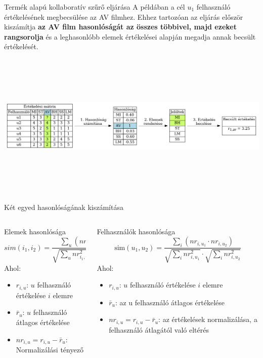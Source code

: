 \documentclass[english, aspectratio=169]{beamer}
\begin{document}
\begin{frame}{Termék alapú kollaboratív szűrő eljárása}
A példában a cél $u_1$ felhasználó értékelésének megbecsülése az AV filmhez. Ehhez tartozóan  az eljárás először kiszámítja \textbf{az AV film hasonlóságát az összes többivel, majd ezeket rangsorolja} és a leghasonlóbb elemek értékelései alapján megadja annak becsült értékelését.\par\medskip
\begin{center}
\includegraphics[width=14cm, height=7cm, keepaspectratio]{graphs/recommender_5.png}
\end{center}
\end{frame}

\begin{frame}{Két egyed hasonlóságának kiszámítása}
\begin{columns}
\begin{column}{.5\textwidth}
\begin{block}{Elemek hasonlósága}
\[
sim\left( i_1,i_2 \right) = \frac{\sum_u\left( nr_{i_1,u} \cdot nr_{i_2,u} \right)}{\sqrt{\sum_u nr^2_{i_1,u}} \cdot \sqrt{\sum_u nr^2_{i_1,u}}}
\]
Ahol:
\begin{itemize}
	\item $r_{i,u}$: $u$ felhasználó értékelése $i$ elemre
	\item $\bar{r}_u$: $u$ felhasználó átlagos értékelése
	\item $nr_{i,u}=r_{i,u} - \bar{r}_u$: Normalizálási tényező
\end{itemize}
\end{block}
\end{column}
\begin{column}{.5\textwidth}
\begin{block}{Felhasználók hasonlósága}
\[
\text{sim}(u_1, u_2) = \frac{\sum_{i} (nr_{i,u_1} \cdot nr_{i,u_2})}
{\sqrt{\sum_{i} nr_{i,u_1}^2} \cdot \sqrt{\sum_{i} nr_{i,u_2}^2}}
\]
Ahol:
\begin{itemize}
    \item \( r_{i,u} \): $u$ felhasználó értékelése $i$ elemre
    \item \( \bar{r}_u \): az u felhasználó átlagos értékelése
    \item \( nr_{i,u} = r_{i,u} - \bar{r}_u \): az értékelések normalizálása, a felhasználó átlagától való eltérés
\end{itemize}
\end{block}
\end{column}
\end{columns}
\end{frame}
\end{document}

